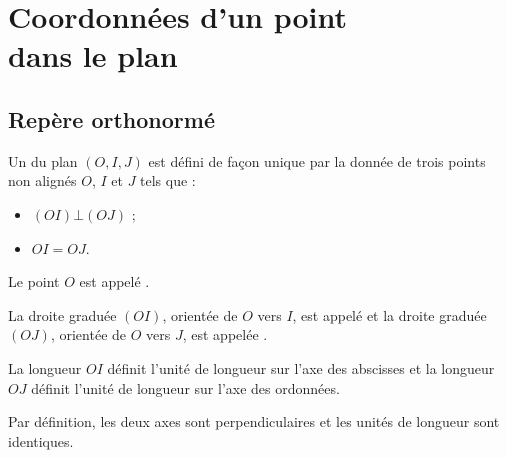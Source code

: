 \documentclass[10pt,openright,twoside,french]{book}
\begin{document}
\setcounter{chapter}{1}
\renewcommand\PartProgramme{Géométrie}
\chapter[Coordonnées d'un point dans le plan]{Coordonnées d'un point\\ dans le plan}\label{ch_coordonnees}

\section{Repère orthonormé}

\begin{Defi}
    Un  du plan $(O,I,J)$ est défini de façon unique par la donnée de trois points non alignés $O$, $I$ et $J$ tels que :
    \begin{itemize}
        \item $(OI) \bot (OJ)$ ;
        \item $OI = OJ$.
    \end{itemize}
    Le point $O$ est appelé .\par
    La droite graduée $(OI)$, orientée de $O$ vers $I$, est appelé  et la droite graduée $(OJ)$, orientée de $O$ vers $J$, est appelée .\par
    La longueur $OI$ définit l'unité de longueur sur l'axe des abscisses et la longueur $OJ$ définit l'unité de longueur sur l'axe des ordonnées.\par
    Par définition, les deux axes sont perpendiculaires et les unités de longueur sont identiques.
\end{Defi}
\end{document}
